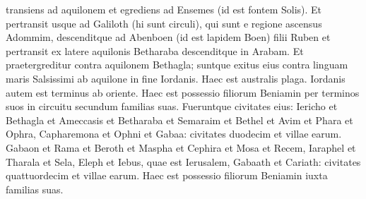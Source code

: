 \begin{biblechapter}
\verse transiens ad aquilonem et egrediens ad Ensemes (id est fontem Solis). Et pertransit usque ad Galiloth (hi sunt circuli), qui sunt e regione ascensus Adommim, descenditque ad Abenboen (id est lapidem Boen) filii Ruben 
\verse et pertransit ex latere aquilonis Betharaba descenditque in Arabam. 
\verse Et praetergreditur contra aquilonem Bethagla; suntque exitus eius contra linguam maris Salsissimi ab aquilone in fine Iordanis. Haec est australis plaga. 
\verse Iordanis autem est terminus ab oriente. Haec est possessio filiorum Beniamin per terminos suos in circuitu secundum familias suas. 
\verse Fueruntque civitates eius: Iericho et Bethagla et Ameccasis 
\verse et Betharaba et Semaraim et Bethel 
\verse et Avim et Phara et Ophra, 
\verse Capharemona et Ophni et Gabaa: civitates duodecim et villae earum. 
\verse Gabaon et Rama et Beroth 
\verse et Maspha et Cephira et Mosa 
\verse et Recem, Iaraphel et Tharala 
\verse et Sela, Eleph et Iebus, quae est Ierusalem, Gabaath et Cariath: civitates quattuordecim et villae earum. Haec est possessio filiorum Beniamin iuxta familias suas. 
\end{biblechapter}

